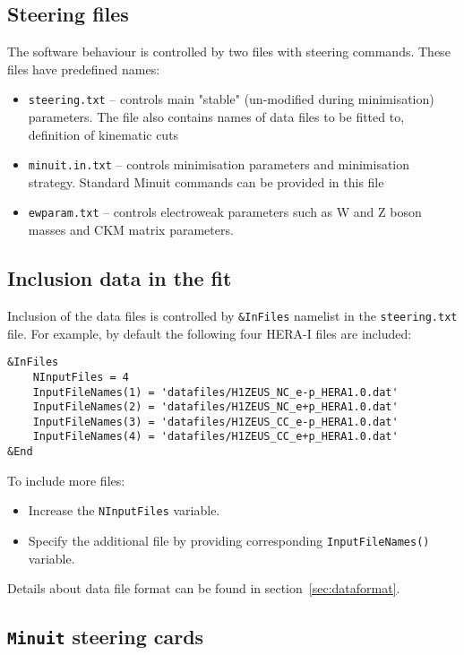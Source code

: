 \documentclass[11pt,a4paper]{article}
\begin{document}
\subsection{Steering files}
    The software behaviour is controlled by two files with steering commands.
    These files have predefined names:
    \begin{itemize}
      \item {\tt steering.txt}  --   controls main "stable" (un-modified during 
                         minimisation) parameters. The file also contains
                         names of data files to be fitted to, definition 
                         of kinematic cuts                              
      \item {\tt minuit.in.txt}
                   --  controls minimisation parameters and minimisation 
                         strategy. Standard Minuit commands can be provided
                         in this file
      \item {\tt ewparam.txt}    --  controls electroweak parameters such
         as W and Z boson masses and CKM matrix parameters.
    \end{itemize}
\subsection{Inclusion data in the fit}
Inclusion of the data files is controlled by {\tt \&InFiles} namelist in the 
{\tt steering.txt} file. For example, by default the following four HERA-I
    files are included:
\begin{verbatim}
&InFiles
    NInputFiles = 4
    InputFileNames(1) = 'datafiles/H1ZEUS_NC_e-p_HERA1.0.dat'
    InputFileNames(2) = 'datafiles/H1ZEUS_NC_e+p_HERA1.0.dat'
    InputFileNames(3) = 'datafiles/H1ZEUS_CC_e-p_HERA1.0.dat'
    InputFileNames(4) = 'datafiles/H1ZEUS_CC_e+p_HERA1.0.dat'
&End
\end{verbatim}

To include more files:
\begin{itemize}
 \item  Increase the {\tt NInputFiles} variable.
 \item  Specify the additional file by providing corresponding
  {\tt InputFileNames()} variable.
\end{itemize}
Details about data file format can be found in section~\ref{sec:dataformat}.

\subsection{{\tt Minuit} steering cards}
\end{document}
